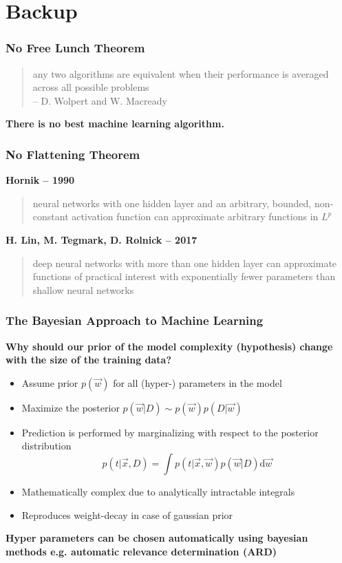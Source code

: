\section[backup]{Backup}

\begin{frame}
  \frametitle{No Free Lunch Theorem}

\begin{quote}
any two algorithms are equivalent when their performance is averaged across all possible problems\\
-- D. Wolpert and W. Macready
\end{quote}

\begin{center}
\textbf{There is no best machine learning algorithm.}
\end{center}

\end{frame}

\begin{frame}
  \frametitle{No Flattening Theorem}

\textbf{Hornik -- 1990}
\begin{quote}
    neural networks with one hidden layer and an arbitrary, bounded, non-constant
    activation function can approximate arbitrary functions in $L^p$
\end{quote}

\textbf{H. Lin, M. Tegmark, D. Rolnick -- 2017}
\begin{quote}
    deep neural networks with more than one hidden layer
    can approximate functions of practical interest with exponentially fewer parameters than shallow neural networks
\end{quote}

\end{frame}

\begin{frame}
  \frametitle{The Bayesian Approach to Machine Learning}
    \textbf{Why should our prior of the model complexity (hypothesis) change with the size of the training data?}
     \begin{itemize}
        \item Assume prior $p(\vec{w})$ for all (hyper-) parameters in the model
        \item Maximize the posterior $p(\vec{w} | D) \sim p(\vec{w}) p(D | \vec{w})$
        \item Prediction is performed by marginalizing with respect to the posterior distribution $$p(t | \vec{x}, D) = \int p(t | \vec{x}, \vec{w}) p(\vec{w} | D) \mathrm{d}\vec{w}$$
        \item Mathematically complex due to analytically intractable integrals
        \item Reproduces weight-decay in case of gaussian prior
    \end{itemize}
    \textbf{Hyper parameters can be chosen automatically using bayesian methods e.g. automatic relevance determination (ARD)}

\end{frame}

